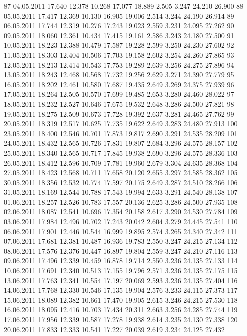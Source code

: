\documentclass[a4paper,11pt]{scrartcl}
\begin{document}
\begin{Schunk}
\begin{Soutput}
87  04.05.2011 17.640 12.378 10.268 17.077 18.889  2.505  3.247 24.210 26.900
88  05.05.2011 17.417 12.369 10.130 16.905 19.006  2.514  3.244 24.190 26.914
89  06.05.2011 17.744 12.319 10.276 17.243 19.023  2.559  3.231 24.095 27.262
90  09.05.2011 18.060 12.361 10.434 17.415 19.161  2.586  3.243 24.180 27.500
91  10.05.2011 18.223 12.388 10.479 17.587 19.228  2.599  3.250 24.230 27.602
92  11.05.2011 18.303 12.404 10.506 17.703 19.158  2.602  3.254 24.260 27.865
93  12.05.2011 18.213 12.414 10.543 17.753 19.289  2.639  3.256 24.275 27.896
94  13.05.2011 18.243 12.468 10.568 17.732 19.256  2.629  3.271 24.390 27.779
95  16.05.2011 18.202 12.461 10.580 17.687 19.435  2.649  3.269 24.375 27.939
96  17.05.2011 18.264 12.505 10.570 17.699 19.485  2.653  3.280 24.460 28.022
97  18.05.2011 18.232 12.527 10.646 17.675 19.532  2.648  3.286 24.500 27.821
98  19.05.2011 18.275 12.509 10.673 17.728 19.392  2.637  3.281 24.465 27.762
99  20.05.2011 18.319 12.517 10.625 17.735 19.622  2.649  3.283 24.480 27.913
100 23.05.2011 18.400 12.546 10.701 17.873 19.817  2.690  3.291 24.535 28.209
101 24.05.2011 18.432 12.565 10.726 17.831 19.807  2.684  3.296 24.575 28.157
102 25.05.2011 18.340 12.565 10.717 17.845 19.938  2.690  3.296 24.575 28.336
103 26.05.2011 18.412 12.596 10.709 17.781 19.960  2.679  3.304 24.635 28.368
104 27.05.2011 18.423 12.568 10.711 17.658 20.120  2.655  3.297 24.585 28.362
105 30.05.2011 18.356 12.532 10.774 17.597 20.175  2.649  3.287 24.510 28.266
106 31.05.2011 18.169 12.544 10.788 17.543 19.994  2.633  3.291 24.540 28.138
107 01.06.2011 18.257 12.526 10.783 17.557 20.136  2.625  3.286 24.500 27.935
108 02.06.2011 18.087 12.541 10.696 17.354 20.158  2.617  3.290 24.530 27.784
109 03.06.2011 17.984 12.496 10.702 17.243 20.042  2.604  3.279 24.445 27.541
110 06.06.2011 17.901 12.446 10.544 16.999 19.895  2.574  3.265 24.340 27.342
111 07.06.2011 17.681 12.381 10.487 16.936 19.783  2.550  3.247 24.215 27.134
112 08.06.2011 17.576 12.376 10.447 16.897 19.804  2.559  3.247 24.210 27.116
113 09.06.2011 17.496 12.339 10.459 16.878 19.714  2.550  3.236 24.135 27.133
114 10.06.2011 17.691 12.340 10.513 17.155 19.796  2.571  3.236 24.135 27.175
115 13.06.2011 17.763 12.341 10.554 17.197 20.069  2.593  3.236 24.135 27.404
116 14.06.2011 17.768 12.330 10.546 17.135 19.904  2.576  3.233 24.115 27.373
117 15.06.2011 18.089 12.382 10.661 17.470 19.905  2.615  3.246 24.215 27.530
118 16.06.2011 18.095 12.416 10.703 17.434 20.311  2.663  3.256 24.285 27.744
119 17.06.2011 17.956 12.339 10.587 17.278 19.938  2.614  3.235 24.130 27.338
120 20.06.2011 17.833 12.333 10.541 17.227 20.039  2.619  3.234 24.125 27.432

\end{Soutput}
\end{Schunk}
\end{document}
